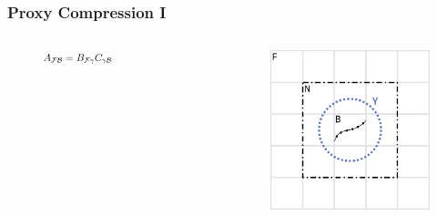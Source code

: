 \begin{frame}
    \frametitle{Proxy Compression I}

    \begin{columns}
        \begin{column}{0.5\textwidth}

            \centering
            \begin{figure}

                \includegraphics[width=0.5\textwidth]{assets/proxy_2.pdf}
            \end{figure}
        \end{column}

        \begin{column}{0.5\textwidth}
            \begin{figure}
                \includegraphics[width=\textwidth]{assets/proxy.pdf}
            \end{figure}
        \end{column}
    \end{columns}

\end{frame}

